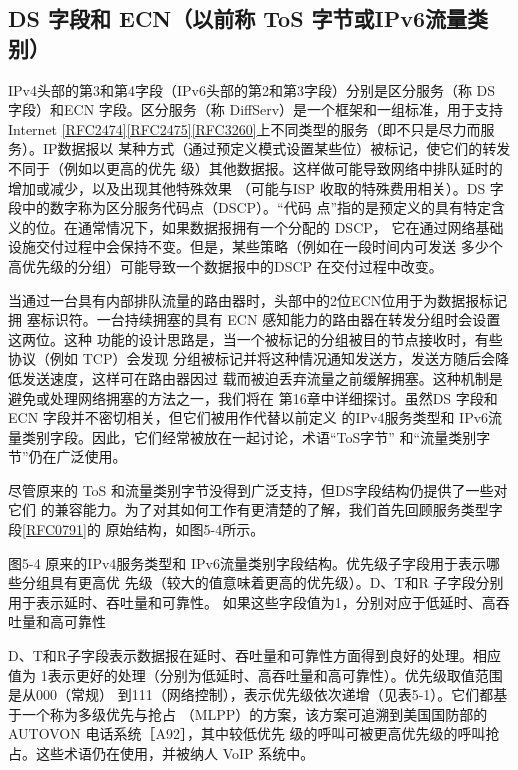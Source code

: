 \subsection{DS 字段和 ECN（以前称 ToS 字节或IPv6流量类别）}
IPv4头部的第3和第4字段（IPv6头部的第2和第3字段）分别是区分服务（称 DS
字段）和ECN 字段。区分服务（称 DiffServ）是一个框架和一组标准，用于支持 Internet
\href{https://www.rfc-editor.org/rfc/rfc2474}{[RFC2474]}\href{https://www.rfc-editor.org/rfc/rfc2475}{[RFC2475]}\href{https://www.rfc-editor.org/rfc/rfc3260}{[RFC3260]}上不同类型的服务（即不只是尽力而服务）。IP数据报以
某种方式（通过预定义模式设置某些位）被标记，使它们的转发不同于（例如以更高的优先
级）其他数据报。这样做可能导致网络中排队延时的增加或减少，以及出现其他特殊效果
（可能与ISP 收取的特殊费用相关）。DS 字段中的数字称为区分服务代码点（DSCP）。“代码
点”指的是预定义的具有特定含义的位。在通常情况下，如果数据报拥有一个分配的 DSCP，
它在通过网络基础设施交付过程中会保持不变。但是，某些策略（例如在一段时间内可发送
多少个高优先级的分组）可能导致一个数据报中的DSCP 在交付过程中改变。

当通过一台具有内部排队流量的路由器时，头部中的2位ECN位用于为数据报标记拥
塞标识符。一台持续拥塞的具有 ECN 感知能力的路由器在转发分组时会设置这两位。这种
功能的设计思路是，当一个被标记的分组被目的节点接收时，有些协议（例如 TCP）会发现
分组被标记并将这种情况通知发送方，发送方随后会降低发送速度，这样可在路由器因过
载而被迫丢弃流量之前缓解拥塞。这种机制是避免或处理网络拥塞的方法之一，我们将在
第16章中详细探讨。虽然DS 字段和ECN 字段并不密切相关，但它们被用作代替以前定义
的IPv4服务类型和 IPv6流量类别字段。因此，它们经常被放在一起讨论，术语“ToS字节”
和“流量类别字节”仍在广泛使用。

尽管原来的 ToS 和流量类别字节没得到广泛支持，但DS字段结构仍提供了一些对它们
的兼容能力。为了对其如何工作有更清楚的了解，我们首先回顾服务类型字段\href{https://www.rfc-editor.org/rfc/rfc0791}{[RFC0791]}的
原始结构，如图5-4所示。

图5-4 原来的IPv4服务类型和 IPv6流量类别字段结构。优先级子字段用于表示哪些分组具有更高优
先级（较大的值意味着更高的优先级）。D、T和R 子字段分别用于表示延时、吞吐量和可靠性。
如果这些字段值为1，分别对应于低延时、高吞吐量和高可靠性

D、T和R子字段表示数据报在延时、吞吐量和可靠性方面得到良好的处理。相应值为
1表示更好的处理（分别为低延时、高吞吐量和高可靠性）。优先级取值范围是从000（常规）
到111（网络控制），表示优先级依次递增（见表5-1）。它们都基于一个称为多级优先与抢占
（MLPP）的方案，该方案可追溯到美国国防部的AUTOVON 电话系统［A92］，其中较低优先
级的呼叫可被更高优先级的呼叫抢占。这些术语仍在使用，并被纳人 VoIP 系统中。


